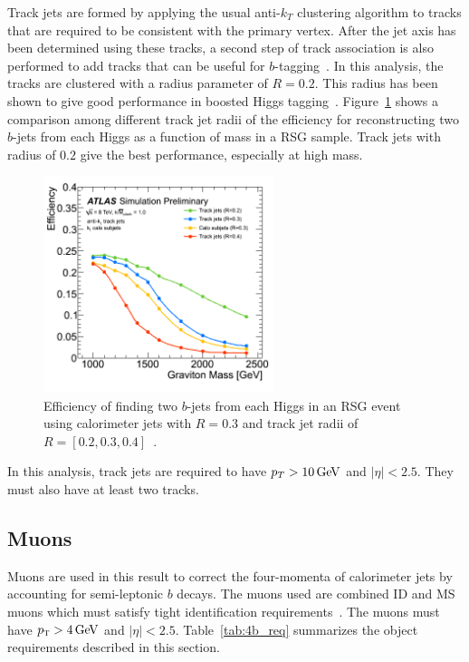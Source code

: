 Track jets are formed by applying the usual anti-$k_{T}$ clustering algorithm to tracks that are required to be consistent with the primary vertex. After the jet axis has been determined using these tracks, a second step of track association is also performed to add tracks that can be useful for $b$-tagging~\cite{TrackJets}. In this analysis, the tracks are clustered with a radius parameter of $R = 0.2$. This radius has been shown to give good performance in boosted Higgs tagging~\cite{TrackJets,BoostedHiggs}. Figure~\ref{fig:rcomp} shows a comparison among different track jet radii of the efficiency for reconstructing two $b$-jets from each Higgs as a function of mass in a RSG sample. Track jets with radius of $0.2$ give the best performance, especially at high mass. 
%
\begin{figure}[b!]
  \centering
  \captionsetup{justification=centering}

  \includegraphics[width=0.6\textwidth]{figures/TrackJet_RComp}
  \caption{Efficiency of finding two $b$-jets from each Higgs in an RSG event using calorimeter jets with $R=0.3$ and track jet radii of $R=[0.2,0.3,0.4]$~\cite{TrackJets}.}
  \label{fig:rcomp}
\end{figure}
%
In this analysis, track jets are required to have $p_{T} > 10 \GeV$ and $|\eta| < 2.5$. They must also have at least two tracks. 

\subsection{Muons}

Muons are used in this result to correct the four-momenta of calorimeter jets by accounting for semi-leptonic $b$ decays. The muons used are combined ID and MS muons which must satisfy tight identification requirements~\cite{MuonRecoRun2}. The muons must have $\pT > 4 \GeV$ and $|\eta| < 2.5$. Table~\ref{tab:4b_req} summarizes the object requirements described in this section.

